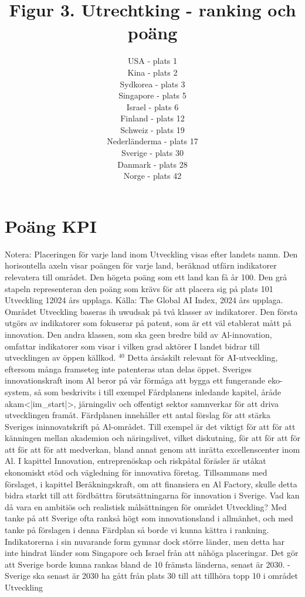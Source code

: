 {{{{{{{\title{
Figur 3. Utrechtking - ranking och poäng
}
\author{
USA - plats 1 \\ Kina - plats 2 \\ Sydkorea - plats 3 \\ Singapore - plats 5 \\ Israel - plats 6 \\ Finland - plats 12 \\ Schweiz - plats 19 \\ Nederländerma - plats 17 \\ Sverige - plats 30 \\ Danmark - plats 28 \\ Norge - plats 42 \\ \hline
}
\section*{Poäng KPI}
Notera: Placeringen för varje land inom Utveckling visas efter landets namn. Den horisontella axeln visar poängen för varje land, beräknad utfärn indikatorer relevatera till området. Den högeta poäng som ett land kan få år 100. Den grå stapeln representeran den poäng som krävs för att placera sig på plats 101 Utveckling 12024 års upplaga.
Källa: The Global AI Index, 2024 års upplaga.
Området Utveckling baseras ih uwudsak på två klasser av indikatorer. Den första utgörs av indikatorer som fokuserar på patent, som är ett väl etablerat mått på innovation. Den andra klassen, som ska geen bredre bild av Al-innovation, omfattar indikatorer som visar i vilken grad aktörer I landet bidrar till utvecklingen av öppen källkod. \({ }^{40}\) Detta årsåskilt relevant för AI-utveckling, eftersom många framseteg inte patenteras utan delas öppet.
Sveriges innovationskraft inom Al beror på vår förmåga att bygga ett fungerande eko-system, så som beskrivits i till exempel Fårdplanens inledande kapitel, åråde akam<|im_start|>, järningsliv och offentigt sektor samnverkar för att driva utvecklingen framåt. Färdplanen innehåller ett antal förslag för att stärka Sveriges ininnovatskrift på Al-området. Till exempel är det viktigt för att för att känningen mellan akademion och näringslivet, vilket diskutning, för att för att för att för att för att medverkan, bland annat genom att inrätta excellenscenter inom Al. I kapittel Innovation, entreprenöskap och riskpåtal föräsler är utåkat ekonomiskt stöd och vägledning för innovativa företag. Tillsammans med förslaget, i kapittel Beräkningskraft, om att finansiera en Al Factory, skulle detta bidra starkt till att fördbättra förutsättningarna för innovation i Sverige.
Vad kan då vara en ambitiös och realistisk målsättningen för området Utveckling? Med tanke på att
Sverige ofta rankså högt som innovationsland i allmänhet, och med tanke på förslagen i denna Färdplan så borde vi kunna kättra i rankning. Indikatorerna i sin nuvarande form gymnar dock större länder, men detta har inte hindrat länder som Singapore och Israel från att nåhöga placeringar. Det gör att Sverige borde kunna rankas bland de 10 främsta länderna, senast är 2030.
- Sverige ska senast är 2030 ha gått från plats 30 till att tillhöra topp 10 i området Utveckling
}}}}}}}
